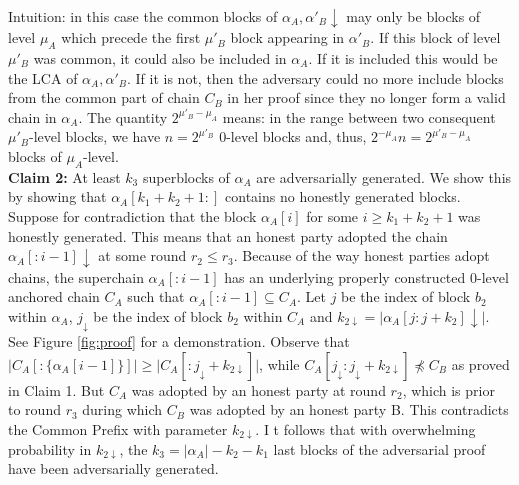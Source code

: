 Intuition: in this case the common blocks of $\alpha_A, \alpha'_B\downarrow$
may only be blocks of level $\mu_A$ which precede the first $\mu'_B$ block
appearing in $\alpha'_B$. If this block of level $\mu'_B$ was common, it could
also be included in $\alpha_A$. If it is included this would be the LCA of
$\alpha_A, \alpha'_B$. If it is not, then the adversary could no more include
blocks from the common part of chain $C_B$ in her proof since they no longer
form a valid chain in $\alpha_A$. The quantity $2^{\mu'_B - \mu_A}$ means: in
the range between two consequent $\mu'_B$-level blocks, we have $n = 2^{\mu'_B}$
0-level blocks and, thus, $2^{-\mu_A}n = 2^{\mu'_B - \mu_A}$ blocks of $\mu_A$-level. \\

\textbf{Claim 2:} At least $k_3$ superblocks of $\alpha_A$ are adversarially generated.
We show this by showing that $\alpha_A[k_1 + k_2 + 1:]$ contains no honestly generated
blocks. Suppose for contradiction that the block $\alpha_A[i]$ for some $i \geq k_1 +
k_2 + 1$ was honestly generated. This means that an honest party adopted the chain
$\alpha_A[:i - 1]\downarrow$ at some round $r_2 \leq r_3$. Because of the way honest
parties adopt chains, the superchain $\alpha_A[:i - 1]$ has an underlying properly
constructed 0-level anchored chain $C_A$ such that $\alpha_A[:i - 1] \subseteq C_A$.
Let $j$ be the index of block $b_2$ within $\alpha_A$, $j_\downarrow$ be the index
of block $b_2$ within $C_A$ and $k_{2\downarrow} = \vert \alpha_A[j:j+k_2]\downarrow\vert$.
See Figure \ref{fig:proof} for a demonstration. Observe that $\vert C_A[:\{\alpha_A[i-1]\}]
\vert \geq \vert C_A[:{j_\downarrow}+k_{2\downarrow}] \vert$, while
$C_A[j_\downarrow:j_\downarrow + k_{2\downarrow}] \npreceq C_B$ as proved in
Claim 1. But $C_A$ was adopted by an honest party at round $r_2$, which is prior
to round $r_3$ during which $C_B$ was adopted by an honest party B. This 
contradicts the Common Prefix\cite{Backbone} with parameter $k_{2\downarrow}$. I
t follows that with overwhelming probability in $k_{2\downarrow}$, the $k_3 =
\vert \alpha_A \vert - k_2 - k_1$ last blocks of the adversarial proof have
been adversarially generated.\\

